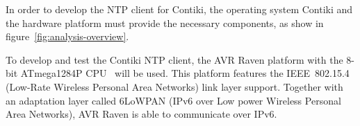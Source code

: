 In order to develop the NTP client for Contiki,
the operating system Contiki and the hardware platform must provide the necessary
components, as show in figure~\ref{fig:analysis-overview}.

To develop and test the Contiki NTP client,
the AVR Raven platform with the 8-bit ATmega1284P CPU~\cite{avr-datasheet} will be used.
This platform features the IEEE~802.15.4 (Low-Rate Wireless Personal Area Networks) link layer support.
Together with an adaptation layer called 6LoWPAN (IPv6 over Low power Wireless Personal Area Networks),
AVR Raven is able to communicate over IPv6.








